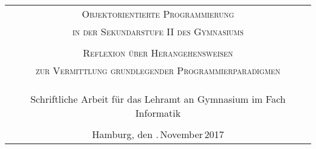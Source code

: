 \begin{titlepage}
\enlargethispage{\baselineskip}

\vspace*{15ex} 
\begin{tabular}{c}

 \\
 \Large\textsc{Objektorientierte Programmierung}\\
\Large\textsc{in der Sekundarstufe II des Gymnasiums} \\
\tiny \\
\normalsize\textsc{Reflexion über Herangehensweisen}\\
\normalsize\textsc{zur Vermittlung grundlegender Programmierparadigmen}\\		  
\\
\\
\\
\normalsize Schriftliche Arbeit für das Lehramt an Gymnasium im Fach Informatik\\
\\
\normalsize Hamburg, den .\,November\,2017

\end{tabular}


\end{titlepage}
